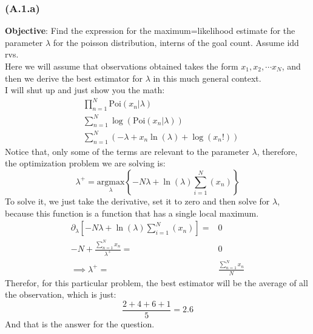 \documentclass[]{article}
\begin{document}
        \subsubsection*{(A.1.a)}\label{A.1.a}
            \textbf{Objective}: Find the expression for the maximum=likelihood estimate for the parameter $\lambda$ for the poisson distribution, interns of the goal count. Assume idd rvs. 
            \\[1em]
            Here we will assume that observations obtained takes the form $x_1, x_2, \cdots x_N$, and then we derive the best estimator for $\lambda$ in this much general context. 
            \\[1em]
            I will shut up and just show you the math: 
            \begin{align*}\tag{A.1.a.1}\label{eqn:A.1.a.1}
                & 
                \prod_{n = 1}^{N} 
                \text{Poi}(x_n|\lambda)
                \\
                &
                \sum_{n = 1}^{N}
                \log\left(
                    \text{Poi}(x_n|\lambda)
                \right)
                \\
                &
                \sum_{n = 1}^{N}
                \left(
                    -\lambda + x_n\ln(\lambda) + \log(x_n!)
                \right)
            \end{align*}
            Notice that, only some of the terms are relevant to the parameter $\lambda$, therefore, the optimization problem we are solving is: 
            \begin{equation*}\tag{A.1.a.2}\label{eqn:A.1.a.2}
                \lambda^+ = 
                \underset{\lambda}{\text{argmax}}
                \left\lbrace
                    -N\lambda
                    +  
                    \ln(\lambda)
                    \sum_{i = 1}^{N}
                        \left(
                            x_n
                        \right)
                \right\rbrace
            \end{equation*}
            To solve it, we just take the derivative, set it to zero and then solve for $\lambda$, because this function is a function that has a single local maximum. 
            \begin{align*}\tag{A.1.a.3}\label{eqn:A.1.a.3}
                \partial_\lambda \left[
                -N\lambda
                +  
                \ln(\lambda)
                \sum_{i = 1}^{N}
                    \left(
                        x_n
                    \right)
                \right] =& 0
                \\
                -N + \frac{\sum_{n = 1}^{N}x_n}{
                \lambda^+
                } =& 0 
                \\
                \implies
                \lambda^+ =& \frac{\sum_{n = 1}^{N}x_n}{N}
            \end{align*}
            Therefor, for this particular problem, the best estimator will be the average of all the observation, which is just: 
            $$
                \frac{2 + 4 + 6 + 1}{5} = 2.6
            $$
            And that is the answer for the question. 
\end{document}
